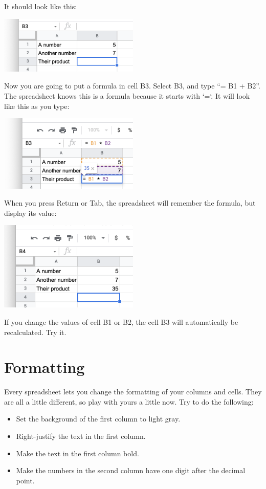 It should look like this:

\includegraphics[width=0.5\textwidth]{NoFormulas.png}

Now you are going to put a formula in cell B3.  Select B3, and type ``= B1 + B2''. The spreadsheet knows this is a formula because it starts with `=`. It will look like this as you type:

\includegraphics[width=0.5\textwidth]{TypingFirstFormula.png}

When you press Return or Tab, the spreadsheet will remember the formula, but display its value:

\includegraphics[width=0.5\textwidth]{FirstCalc.png}

If you change the values of cell B1 or B2, the cell B3 will automatically be recalculated. Try it.

\section{Formatting}

Every spreadsheet lets you change the formatting of your columns and cells. They are all a little different, so play with yours a little now.  Try to do the following:
\begin{itemize}
\item Set the background of the first column to light gray.
\item Right-justify the text in the first column.
\item Make the text in the first column bold.
\item Make the numbers in the second column have one digit after the decimal point.
\end{itemize}

